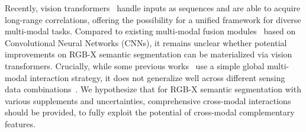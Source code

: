 \documentclass[journal]{IEEEtran}
\begin{document}
Recently, vision transformers~\cite{vaswani2017attention,dosovitskiy2021vit,touvron2021deit,liu2021swin} handle inputs as sequences and are able to acquire long-range correlations, offering the possibility for a unified framework for diverse multi-modal tasks. Compared to existing multi-modal fusion modules~\cite{hu2019acnet,xiang2021polarization,deng2021feanet} based on Convolutional Neural Networks (CNNs), it remains unclear whether potential improvements on RGB-X semantic segmentation can be materialized via vision transformers. 
Crucially, while some previous works~\cite{hu2019acnet,chen2020sa_gate} use a simple global multi-modal interaction strategy, it does not generalize well across different sensing data combinations~\cite{zhang2021abmdrnet}. We hypothesize that for RGB-X semantic segmentation with various supplements and uncertainties, comprehensive cross-modal interactions should be provided, to fully exploit the potential of cross-modal complementary features.
\end{document}
